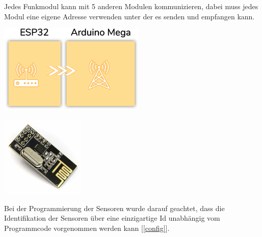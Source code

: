 \documentclass[
  12pt, %
  a4paper, %
  twoside, %
  openany, %
  numbers=noenddot, %
  BCOR=5mm, %
  parskip=half*, %
  thesis, %
]{bfhbook}
\newcommand{\compImgSize}{4cm}
\begin{document}
 Jedes Funkmodul kann mit 5 anderen Modulen kommunizieren, dabei muss jedes Modul eine eigene Adresse verwenden unter der es senden und empfangen kann.
\begin{center}
    \begin{minipage}[b]{0.45\textwidth}
        \centering
        \includegraphics[width=7cm]{Bilder/ESP32-Arduino.png} %
        \captionsetup{justification=centering}
    \end{minipage}\hfill
    \begin{minipage}[b]{0.45\textwidth}\label{nrf24}
        \centering
        \includegraphics[width=\compImgSize]{Bilder/NRF24.jpg} %
        \captionsetup{justification=centering}
    \end{minipage}
\end{center}
Bei der Programmierung der Sensoren wurde darauf geachtet, dass die Identifikation der Sensoren über eine einzigartige Id unabhängig vom Programmcode vorgenommen werden kann [\ref{config}].
\end{document}
